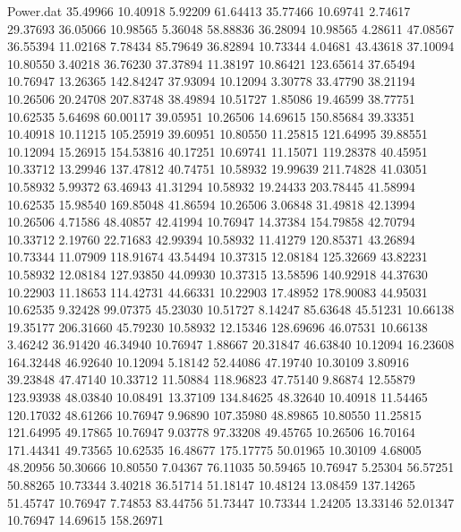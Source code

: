 \begin{filecontents}{Power.dat}
  35.49966   10.40918    5.92209   61.64413
  35.77466   10.69741    2.74617   29.37693
  36.05066   10.98565    5.36048   58.88836
  36.28094   10.98565    4.28611   47.08567
  36.55394   11.02168    7.78434   85.79649
  36.82894   10.73344    4.04681   43.43618
  37.10094   10.80550    3.40218   36.76230
  37.37894   11.38197   10.86421  123.65614
  37.65494   10.76947   13.26365  142.84247
  37.93094   10.12094    3.30778   33.47790
  38.21194   10.26506   20.24708  207.83748
  38.49894   10.51727    1.85086   19.46599
  38.77751   10.62535    5.64698   60.00117
  39.05951   10.26506   14.69615  150.85684
  39.33351   10.40918   10.11215  105.25919
  39.60951   10.80550   11.25815  121.64995
  39.88551   10.12094   15.26915  154.53816
  40.17251   10.69741   11.15071  119.28378
  40.45951   10.33712   13.29946  137.47812
  40.74751   10.58932   19.99639  211.74828
  41.03051   10.58932    5.99372   63.46943
  41.31294   10.58932   19.24433  203.78445
  41.58994   10.62535   15.98540  169.85048
  41.86594   10.26506    3.06848   31.49818
  42.13994   10.26506    4.71586   48.40857
  42.41994   10.76947   14.37384  154.79858
  42.70794   10.33712    2.19760   22.71683
  42.99394   10.58932   11.41279  120.85371
  43.26894   10.73344   11.07909  118.91674
  43.54494   10.37315   12.08184  125.32669
  43.82231   10.58932   12.08184  127.93850
  44.09930   10.37315   13.58596  140.92918
  44.37630   10.22903   11.18653  114.42731
  44.66331   10.22903   17.48952  178.90083
  44.95031   10.62535    9.32428   99.07375
  45.23030   10.51727    8.14247   85.63648
  45.51231   10.66138   19.35177  206.31660
  45.79230   10.58932   12.15346  128.69696
  46.07531   10.66138    3.46242   36.91420
  46.34940   10.76947    1.88667   20.31847
  46.63840   10.12094   16.23608  164.32448
  46.92640   10.12094    5.18142   52.44086
  47.19740   10.30109    3.80916   39.23848
  47.47140   10.33712   11.50884  118.96823
  47.75140    9.86874   12.55879  123.93938
  48.03840   10.08491   13.37109  134.84625
  48.32640   10.40918   11.54465  120.17032
  48.61266   10.76947    9.96890  107.35980
  48.89865   10.80550   11.25815  121.64995
  49.17865   10.76947    9.03778   97.33208
  49.45765   10.26506   16.70164  171.44341
  49.73565   10.62535   16.48677  175.17775
  50.01965   10.30109    4.68005   48.20956
  50.30666   10.80550    7.04367   76.11035
  50.59465   10.76947    5.25304   56.57251
  50.88265   10.73344    3.40218   36.51714
  51.18147   10.48124   13.08459  137.14265
  51.45747   10.76947    7.74853   83.44756
  51.73447   10.73344    1.24205   13.33146
  52.01347   10.76947   14.69615  158.26971

\end{filecontents}
